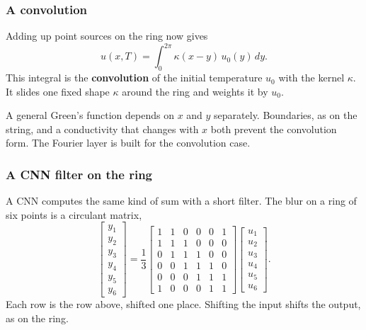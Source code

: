 \documentclass{beamer}
\begin{document}
\begin{frame}
\frametitle{A convolution}
Adding up point sources on the ring now gives
\[
\boxed{u(x,T)=\int_0^{2\pi} \kappa(x-y)\,u_0(y)\,dy.}
\]
This integral is the \textbf{convolution} of the initial temperature $u_0$ with the kernel $\kappa$.
It slides one fixed shape $\kappa$ around the ring and weights it by $u_0$.
\bigskip

A general Green's function depends on $x$ and $y$ separately.
Boundaries, as on the string, and a conductivity that changes with $x$ both prevent the convolution form.
The Fourier layer is built for the convolution case.
\end{frame}

\begin{frame}
\frametitle{A CNN filter on the ring}
A CNN computes the same kind of sum with a short filter.
The blur on a ring of six points is a circulant matrix,
\[
\begin{bmatrix}y_1\\y_2\\y_3\\y_4\\y_5\\y_6\end{bmatrix}
=\frac13
\begin{bmatrix}
1&1&0&0&0&1\\
1&1&1&0&0&0\\
0&1&1&1&0&0\\
0&0&1&1&1&0\\
0&0&0&1&1&1\\
1&0&0&0&1&1
\end{bmatrix}
\begin{bmatrix}u_1\\u_2\\u_3\\u_4\\u_5\\u_6\end{bmatrix}.
\]
Each row is the row above, shifted one place.
Shifting the input shifts the output, as on the ring.
\end{frame}
\end{document}
